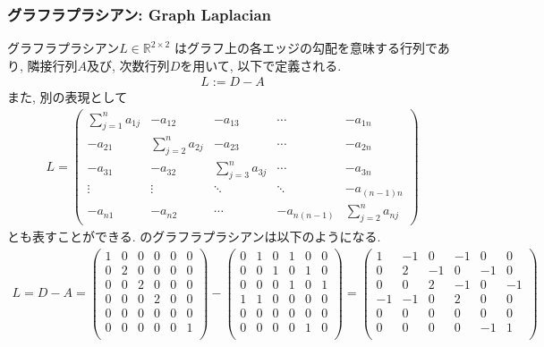 \subsubsection*{グラフラプラシアン: Graph Laplacian}
グラフラプラシアン$L \in \mathbb{R}^{2\times 2}$
はグラフ上の各エッジの勾配を意味する行列であり, 隣接行列$A$及び, 次数行列$D$を用いて, 
以下で定義される.
\begin{align}
  L:=D-A
\end{align}
また, 別の表現として
\begin{align}
  L=
  \begin{pmatrix}
    \displaystyle\sum_{j=1}^n a_{1j}&\displaystyle -a_{12}&\displaystyle -a_{13}&\cdots&\displaystyle -a_{1n}\\
    \displaystyle -a_{21}&\displaystyle\sum_{j=2}^n a_{2j}&-a_{23}&\cdots&\displaystyle -a_{2n}\\
    \displaystyle -a_{31}&-a_{32}&\displaystyle\sum_{j=3}^n a_{3j}&\cdots&\displaystyle -a_{3n}\\
    \vdots&\vdots&\ddots&\ddots&\displaystyle -a_{(n-1)n}\\
    \displaystyle -a_{n1}&-a_{n2}&\cdots&-a_{n(n-1)}&\displaystyle\sum_{j=2}^n a_{nj}
  \end{pmatrix} 
\end{align}
とも表すことができる.
のグラフラプラシアンは以下のようになる.
\begin{align}
  L=D-A=
  \begin{pmatrix}
    1&0&0&0&0&0\\
    0& 2&0&0&0&0\\
    0&0& 2&0&0&0\\
    0&0&0& 2&0&0\\
    0&0&0&0& 0&0\\
    0&0&0&0&0& 1\\
  \end{pmatrix}  
  -
  \begin{pmatrix}
    0&1&0&1&0&0\\
    0&0&1&0&1&0\\
    0&0&0&1&0&1\\
    1&1&0&0&0&0\\
    0&0&0&0&0&0\\
    0&0&0&0&1&0\\
  \end{pmatrix} 
  =
  \begin{pmatrix}
    1&-1&0&-1&0&0\\
    0& 2&-1&0&-1&0\\
    0&0& 2&-1&0&-1\\
    -1&-1&0& 2&0&0\\
    0&0&0&0& 0&0\\
    0&0&0&0&-1& 1\\
  \end{pmatrix}  
\end{align}
